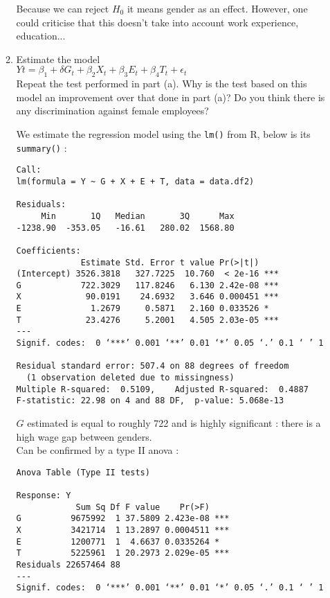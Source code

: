 \documentclass[12pt]{article}
\begin{document}
\begin{enumerate}
\begin{enumerate}
\begin{Answer}
Because we can reject $H_0$ it means gender as an effect. However, one could criticise that this doesn't take into account work experience, education...

\end{Answer}

\item Estimate the model \\
$Yt =\beta_1 +\delta G_t +\beta_2 X_t +\beta_3 E_t +\beta_4 T_t +\epsilon_t$\\
Repeat the test performed in part (a). Why is the test based on this model an improvement over that done in part (a)? Do you think there is any discrimination against female employees?

\begin{Answer}

We estimate the regression model using the \verb|lm()| from R, below is its \verb|summary()| :

\begin{verbatim}
Call:
lm(formula = Y ~ G + X + E + T, data = data.df2)

Residuals:
     Min       1Q   Median       3Q      Max 
-1238.90  -353.05   -16.61   280.02  1568.80 

Coefficients:
             Estimate Std. Error t value Pr(>|t|)    
(Intercept) 3526.3818   327.7225  10.760  < 2e-16 ***
G            722.3029   117.8246   6.130 2.42e-08 ***
X             90.0191    24.6932   3.646 0.000451 ***
E              1.2679     0.5871   2.160 0.033526 *  
T             23.4276     5.2001   4.505 2.03e-05 ***
---
Signif. codes:  0 ‘***’ 0.001 ‘**’ 0.01 ‘*’ 0.05 ‘.’ 0.1 ‘ ’ 1

Residual standard error: 507.4 on 88 degrees of freedom
  (1 observation deleted due to missingness)
Multiple R-squared:  0.5109,	Adjusted R-squared:  0.4887 
F-statistic: 22.98 on 4 and 88 DF,  p-value: 5.068e-13
\end{verbatim}

$G$ estimated is equal to roughly 722 and is highly significant : there is a high wage gap between genders. \\

Can be confirmed by a type II anova : \\
\begin{verbatim}
Anova Table (Type II tests)

Response: Y
            Sum Sq Df F value    Pr(>F)    
G          9675992  1 37.5809 2.423e-08 ***
X          3421714  1 13.2897 0.0004511 ***
E          1200771  1  4.6637 0.0335264 *  
T          5225961  1 20.2973 2.029e-05 ***
Residuals 22657464 88                      
---
Signif. codes:  0 ‘***’ 0.001 ‘**’ 0.01 ‘*’ 0.05 ‘.’ 0.1 ‘ ’ 1
\end{verbatim}

\end{Answer}

\end{enumerate}

\end{enumerate}
\end{document}
